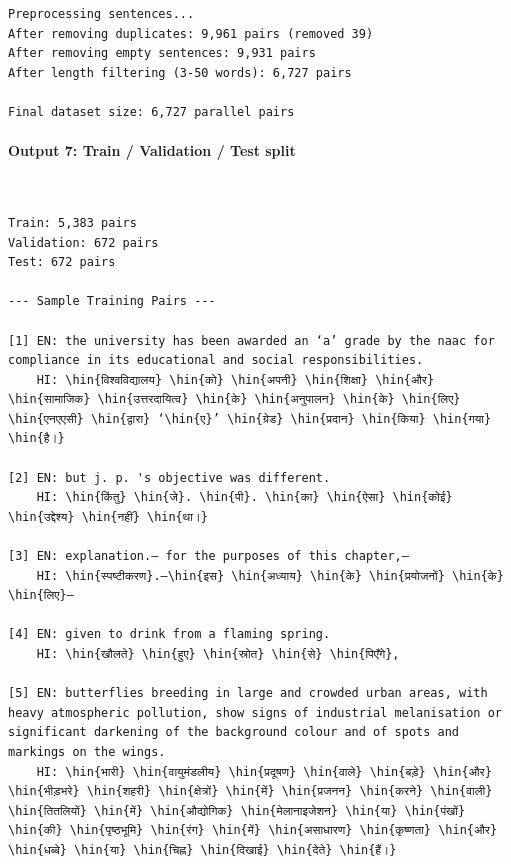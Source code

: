 \documentclass[12pt,a4paper,oneside]{report}
\newcommand{\hin}[1]{{\hinfont #1}}
\begin{document}
\begin{Verbatim}[commandchars=\\\{\},breaklines=true,breakanywhere=true,fontsize=\scriptsize,frame=leftline,framesep=2mm,rulecolor=\color{gray}]
Preprocessing sentences...
After removing duplicates: 9,961 pairs (removed 39)
After removing empty sentences: 9,931 pairs
After length filtering (3-50 words): 6,727 pairs

Final dataset size: 6,727 parallel pairs
\end{Verbatim}
\paragraph{Output 7: Train / Validation / Test split}\mbox{}\\[-1ex]
\begin{Verbatim}[commandchars=\\\{\},breaklines=true,breakanywhere=true,fontsize=\scriptsize,frame=leftline,framesep=2mm,rulecolor=\color{gray}]
Train: 5,383 pairs
Validation: 672 pairs
Test: 672 pairs

--- Sample Training Pairs ---

[1] EN: the university has been awarded an ‘a’ grade by the naac for compliance in its educational and social responsibilities.
    HI: \hin{विश्वविद्यालय} \hin{को} \hin{अपनी} \hin{शिक्षा} \hin{और} \hin{सामाजिक} \hin{उत्तरदायित्व} \hin{के} \hin{अनुपालन} \hin{के} \hin{लिए} \hin{एनएएसी} \hin{द्वारा} ‘\hin{ए}’ \hin{ग्रेड} \hin{प्रदान} \hin{किया} \hin{गया} \hin{है।}

[2] EN: but j. p. 's objective was different.
    HI: \hin{किंतु} \hin{जे}. \hin{पी}. \hin{का} \hin{ऐसा} \hin{कोई} \hin{उद्देश्य} \hin{नहीं} \hin{था।}

[3] EN: explanation.— for the purposes of this chapter,—
    HI: \hin{स्पष्टीकरण}.–\hin{इस} \hin{अध्याय} \hin{के} \hin{प्रयोजनों} \hin{के} \hin{लिए}–

[4] EN: given to drink from a flaming spring.
    HI: \hin{खौलते} \hin{हुए} \hin{स्रोत} \hin{से} \hin{पिएँगे},

[5] EN: butterflies breeding in large and crowded urban areas, with heavy atmospheric pollution, show signs of industrial melanisation or significant darkening of the background colour and of spots and markings on the wings.
    HI: \hin{भारी} \hin{वायुमंडलीय} \hin{प्रदूषण} \hin{वाले} \hin{बड़े} \hin{और} \hin{भीड़भरे} \hin{शहरी} \hin{क्षेत्रों} \hin{में} \hin{प्रजनन} \hin{करने} \hin{वाली} \hin{तितलियों} \hin{में} \hin{औद्योगिक} \hin{मेलानाइजेशन} \hin{या} \hin{पंखों} \hin{की} \hin{पृष्ठभूमि} \hin{रंग} \hin{में} \hin{असाधारण} \hin{कृष्णता} \hin{और} \hin{धब्बे} \hin{या} \hin{चिह्न} \hin{दिखाई} \hin{देते} \hin{हैं।}
\end{Verbatim}
\end{document}
